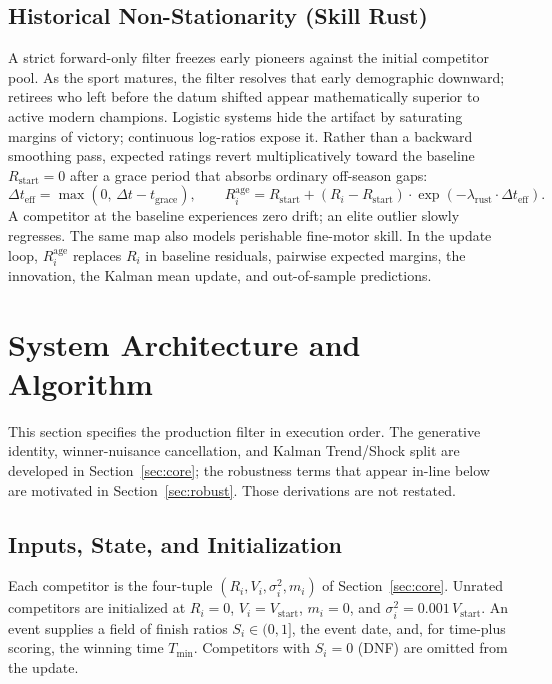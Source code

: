 \documentclass[12pt]{article}
\newcommand{\sigmai}{\sigma_i^2}
\newcommand{\vstart}{V_{\mathrm{start}}}
\newcommand{\lambdar}{\lambda_{\mathrm{rust}}}
\newcommand{\tgrace}{t_{\mathrm{grace}}}
\newcommand{\tmin}{T_{\mathrm{min}}}
\begin{document}
	\subsection{Historical Non-Stationarity (Skill Rust)}
	\label{sec:rust}
	A strict forward-only filter freezes early pioneers against the initial competitor pool. As the sport matures, the filter resolves that early demographic downward; retirees who left before the datum shifted appear mathematically superior to active modern champions. Logistic systems hide the artifact by saturating margins of victory; continuous log-ratios expose it. Rather than a backward smoothing pass, expected ratings revert multiplicatively toward the baseline $R_{\mathrm{start}} = 0$ after a grace period that absorbs ordinary off-season gaps:
	\begin{equation}
		\Delta t_{\mathrm{eff}} = \max(0,\, \Delta t - \tgrace), \qquad
		R_i^{\mathrm{age}} = R_{\mathrm{start}} + (R_i - R_{\mathrm{start}}) \cdot \exp(-\lambdar \cdot \Delta t_{\mathrm{eff}}).
	\end{equation}
	A competitor at the baseline experiences zero drift; an elite outlier slowly regresses. The same map also models perishable fine-motor skill. In the update loop, $R_i^{\mathrm{age}}$ replaces $R_i$ in baseline residuals, pairwise expected margins, the innovation, the Kalman mean update, and out-of-sample predictions.

	\section{System Architecture and Algorithm}
	\label{sec:algorithm}

	This section specifies the production filter in execution order. The generative identity, winner-nuisance cancellation, and Kalman Trend/Shock split are developed in Section~\ref{sec:core}; the robustness terms that appear in-line below are motivated in Section~\ref{sec:robust}. Those derivations are not restated.

	\subsection{Inputs, State, and Initialization}
	Each competitor is the four-tuple $(R_i, V_i, \sigmai, m_i)$ of Section~\ref{sec:core}. Unrated competitors are initialized at $R_i = 0$, $V_i = \vstart$, $m_i = 0$, and $\sigmai = 0.001\,\vstart$. An event supplies a field of finish ratios $S_i \in (0,1]$, the event date, and, for time-plus scoring, the winning time $\tmin$. Competitors with $S_i = 0$ (DNF) are omitted from the update.
\end{document}

